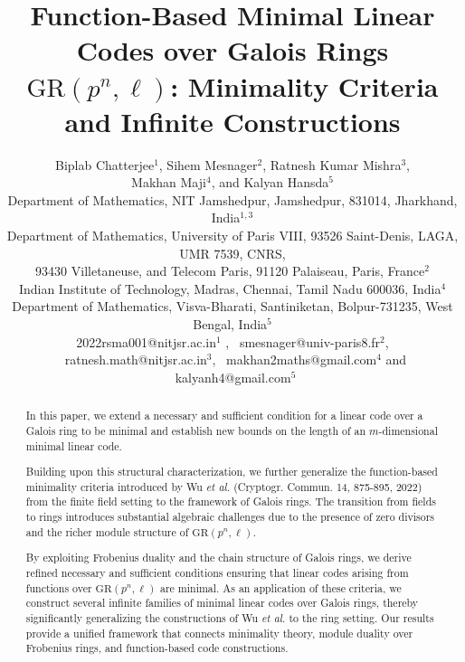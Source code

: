 \documentclass[10pt]{article}
\theoremstyle{definition}
\begin{document}
\date{}


\title{Function-Based Minimal Linear Codes over Galois Rings $\mathrm{GR}(p^{n}, \ell)$: Minimality Criteria and Infinite Constructions}
\author{Biplab Chatterjee$^1$, Sihem Mesnager$^2$, Ratnesh Kumar Mishra$^3$, \\
Makhan Maji$^4$, and Kalyan Hansda$^5$  \\
\footnotesize{Department of Mathematics, NIT Jamshedpur, Jamshedpur, 831014, Jharkhand, India$^{1,3}$}\\
\footnotesize{Department of Mathematics, University of Paris VIII, 93526 Saint-Denis, LAGA, UMR 7539, CNRS,}\\
\footnotesize{93430 Villetaneuse, and Telecom Paris, 91120 Palaiseau, Paris, France$^2$}\\
\footnotesize{Indian Institute of Technology, Madras, Chennai, Tamil Nadu 600036, India$^4$} \\
\footnotesize{Department of Mathematics, Visva-Bharati, Santiniketan, Bolpur-731235, West Bengal, India$^{5}$}\\
\footnotesize{2022rsma001@nitjsr.ac.in$^{1}$} , \
\footnotesize{smesnager@univ-paris8.fr$^{2}$}, \
\footnotesize{ratnesh.math@nitjsr.ac.in$^{3}$}, \
\footnotesize{makhan2maths@gmail.com$^{4}$} and \
\footnotesize{kalyanh4@gmail.com$^{5}$}}


\maketitle


\begin{abstract}
In this paper, we extend a necessary and sufficient condition for a linear code over a Galois ring to be minimal and establish new bounds on the length of an $m$-dimensional minimal linear code.

Building upon this structural characterization, we further generalize the function-based minimality criteria introduced by Wu \emph{et al.} (Cryptogr. Commun. 14, 875-895, 2022) from the finite field setting to the framework of Galois rings. The transition from fields to rings introduces substantial algebraic challenges due to the presence of zero divisors and the richer module structure of $\mathrm{GR}(p^{n},\ell)$.

By exploiting Frobenius duality and the chain structure of Galois rings, we derive refined necessary and sufficient conditions ensuring that linear codes arising from functions over $\mathrm{GR}(p^{n},\ell)$ are minimal. As an application of these criteria, we construct several infinite families of minimal linear codes over Galois rings, thereby significantly generalizing the constructions of Wu \emph{et al.} to the ring setting.
Our results provide a unified framework that connects minimality theory, module duality over Frobenius rings, and function-based code constructions.
\end{abstract}
\end{document}
